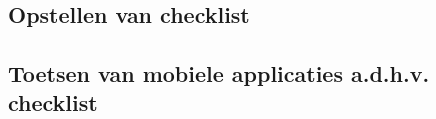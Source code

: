 \chapter{}
\label{ch:toetsenApplicaties}

\section{Opstellen van checklist }
\label{sec:checklist}
\lipsum[76-80]

\section{Toetsen van mobiele applicaties a.d.h.v. checklist}
\label{sec:checklistTesting}
\lipsum[76-80]